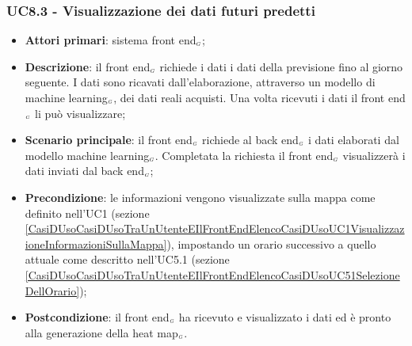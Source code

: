 \subsubsection{UC8.3 - Visualizzazione dei dati futuri predetti}\label{CasiDUsoCasiDUsoTraIlFrontEndEIlBackEndElencoDeiCasiDUsoUC83VisualizzazioneDeiDatiPredetti}
\begin{itemize}
	\item \textbf{Attori primari}: sistema front end$_{\scaleto{G}{3pt}}$;
	\item \textbf{Descrizione}: il front end$_{\scaleto{G}{3pt}}$ richiede i dati i dati della previsione fino al giorno seguente.
	I dati sono ricavati dall’elaborazione, attraverso un modello di machine learning$_{\scaleto{G}{3pt}}$, dei dati reali acquisti. Una volta ricevuti i dati il front end$_{\scaleto{G}{3pt}}$ li può visualizzare;
	\item \textbf{Scenario principale}: il front end$_{\scaleto{G}{3pt}}$ richiede al back end$_{\scaleto{G}{3pt}}$ i dati elaborati dal modello machine learning$_{\scaleto{G}{3pt}}$. Completata la richiesta il front end$_{\scaleto{G}{3pt}}$ visualizzerà i dati inviati dal back end$_{\scaleto{G}{3pt}}$;
	\item \textbf{Precondizione}: le informazioni vengono visualizzate sulla mappa come definito nell’UC1 (sezione \ref{CasiDUsoCasiDUsoTraUnUtenteEIlFrontEndElencoCasiDUsoUC1VisualizzazioneInformazioniSullaMappa}), impostando un orario successivo a quello attuale come descritto nell’UC5.1 (sezione \ref{CasiDUsoCasiDUsoTraUnUtenteEIlFrontEndElencoCasiDUsoUC51SelezioneDellOrario});
	\item \textbf{Postcondizione}: il front end$_{\scaleto{G}{3pt}}$ ha ricevuto e visualizzato i dati ed è pronto alla generazione della heat map$_{\scaleto{G}{3pt}}$.
\end{itemize}

